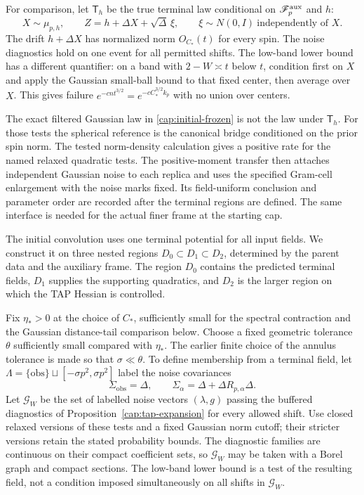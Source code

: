 For comparison, let $\mathsf T_h$ be the true terminal law conditional on
$\mathscr F_p^{\rm aux}$ and $h$:
\[
 X\sim\mu_{p,h},\qquad Z=h+\Delta X+\sqrt\Delta\,\xi,\qquad
 \xi\sim N(0,I)\ \text{independently of }X.
\]
The drift $h+\Delta X$ has normalized norm $O_{C_*}(t)$ for every spin.
The noise diagnostics hold on one event for all permitted shifts. The
low-band lower bound has a different quantifier: on a band with
$2-W\asymp t$ below $t$, condition first on $X$ and apply the Gaussian
small-ball bound to that fixed center, then average over $X$. This gives
failure $e^{-c nt^{3/2}}=e^{-cC_*^{3/2}k_p}$ with no union over centers.

The exact filtered Gaussian law in \eqref{cap:initial-frozen} is not the
law under $\mathsf T_h$. For those tests the spherical reference is the
canonical bridge conditioned on the prior spin norm. The tested norm-density
calculation gives a positive rate for the named relaxed quadratic tests.
The positive-moment transfer then attaches independent Gaussian noise to
each replica and uses the specified Gram-cell enlargement with the noise
marks fixed. Its field-uniform conclusion and parameter order are recorded
after the terminal regions are defined. The same interface is needed for
the actual finer frame at the starting cap.

The initial convolution uses one terminal potential for all input fields.
We construct it on three nested regions $D_0\subset D_1\subset D_2$,
determined by the parent data and the auxiliary frame. The region $D_0$
contains the predicted terminal fields, $D_1$ supplies the supporting
quadratics, and $D_2$ is the larger region on which the TAP Hessian is
controlled.

Fix $\eta_*>0$ at the choice of $C_*$, sufficiently small for the spectral
contraction and the Gaussian distance-tail comparison below. Choose a fixed
geometric tolerance $\theta$ sufficiently small compared with $\eta_*$.
The earlier finite choice of the annulus tolerance is made so that
$\sigma\ll\theta$. To define membership from a terminal field, let
$\Lambda=\{\mathrm{obs}\}\sqcup[-\sigma p^2,\sigma p^2]$ label the noise
covariances
\[
 \Sigma_{\mathrm{obs}}=\Delta,\qquad
 \Sigma_\alpha=\Delta+\Delta R_{p,\alpha}\Delta .
\]
Let $\mathcal G_W$ be the set of labelled noise vectors $(\lambda,g)$
passing the buffered diagnostics of Proposition~\ref{cap:tap-expansion}
for every allowed shift. Use closed relaxed versions of these tests and a
fixed Gaussian norm cutoff; their stricter versions retain the stated
probability bounds. The diagnostic families are continuous on their compact
coefficient sets, so $\mathcal G_W$ may be taken with a Borel graph and compact
sections. The low-band lower bound is a test of the resulting field, not a
condition imposed simultaneously on all shifts in $\mathcal G_W$.


